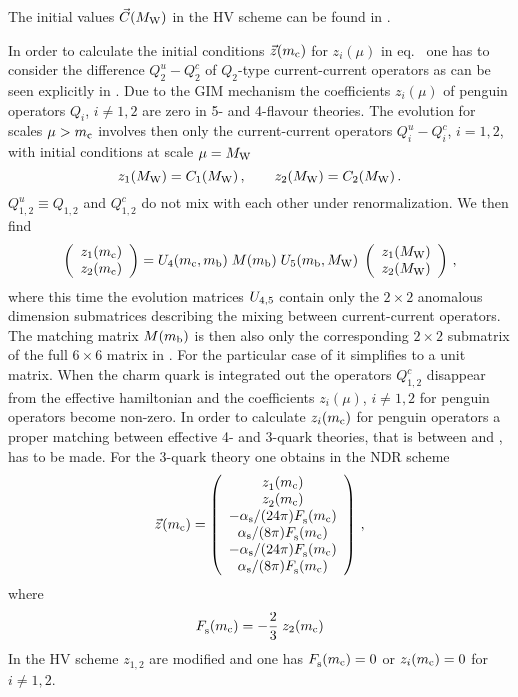 The initial values $\vec{C}(M_{\rm W})$ in the HV scheme can be found in
\cite{burasetal:92a}.

In order to calculate the initial conditions $\vec{z}(m_{\rm c})$ for
$z_i(\mu)$ in eq.~ one has to consider the difference
$Q_2^u - Q_2^c$ of $Q_2$-type current-current operators
as can be seen explicitly in . Due to the GIM
mechanism the coefficients $z_i(\mu)$ of penguin operators $Q_i$,
$i\not=1,2$ are zero in 5- and 4-flavour theories. The evolution for
scales $\mu > m_{\rm c}$ involves then only the current-current operators
$Q^u_i-Q^c_i$, $i=1, 2$,  with initial conditions at
scale $\mu = M_{\rm W}$
\begin{equation}
z_1(M_{\rm W}) = C_1(M_{\rm W}) \, ,
\qquad
z_2(M_{\rm W}) = C_2(M_{\rm W}) \, .
\label{eq:zMw12}
\end{equation}
$Q_{1,2}^u\equiv Q_{1,2}$ and $Q_{1,2}^c$ do not mix with each other under
renormalization. We then find
\begin{equation}
\left( \begin{array}{ll} z_1(m_{\rm c}) \\ z_2(m_{\rm c}) \end{array} \right) =
U_4(m_{\rm c},m_{\rm b}) \; M(m_{\rm b}) \; U_5(m_{\rm b},M_{\rm W}) \;
\left( \begin{array}{ll} z_1(M_{\rm W}) \\ z_2(M_{\rm W}) \end{array} \right) \, ,
\label{eq:zmc12}
\end{equation}
where this time the evolution matrices $U_{4,5}$ contain only the $2
\times 2$ anomalous dimension submatrices describing the mixing between
current-current operators. The matching matrix $M(m_{\rm b})$ is then also
only the corresponding $2 \times 2$ submatrix of the full $6 \times 6$
matrix in . For the particular case of  it
simplifies to a unit matrix. When the charm quark is integrated out the
operators $Q_{1,2}^c$ disappear from the effective hamiltonian and the
coefficients $z_i(\mu)$, $i\not=1,2$ for penguin operators become
non-zero. In order to calculate $z_i(m_{\rm c})$ for penguin operators a
proper matching between effective 4- and 3-quark theories,
that is between  and , has to be
made. For the 3-quark theory one obtains in the NDR scheme
\cite{burasetal:92d}
\begin{equation}
\vec{z}^{\rm }(m_{\rm c}) =
\left( \begin{array}{c}
z_1^{\rm }(m_{\rm c}) \\ z_2^{\rm }(m_{\rm c}) \\
-\alpha_{\rm s}/(24\pi) F_{\rm s}^{\rm }(m_{\rm c}) \\ \alpha_{\rm s}/(8\pi) F_{\rm s}^{\rm }(m_{\rm c}) \\ 
-\alpha_{\rm s}/(24\pi) F_{\rm s}^{\rm }(m_{\rm c}) \\ \alpha_{\rm s}/(8\pi) F_{\rm s}^{\rm }(m_{\rm c})
\end{array} \right) \, ,
\label{eq:zmc}
\end{equation}
where 
\begin{equation}
F_{\rm s}^{\rm }(m_{\rm c}) =
-\frac{2}{3} \; z_2(m_{\rm c})
\label{eq:Fsmc}
\end{equation}
In the HV scheme $z_{1,2}$ are modified and one has $F_{\rm s}^{\rm }(m_{\rm c})
= 0$ or $z_i(m_{\rm c}) = 0$ for $i\not=1,2$.

